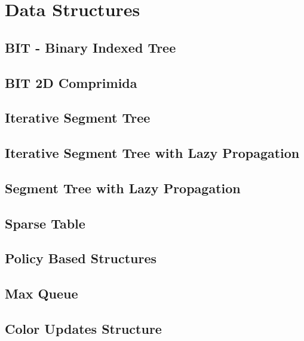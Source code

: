 \section{Data Structures}
\subsection{	BIT - Binary Indexed Tree}
\raggedbottom
\hrulefill
\subsection{BIT 2D Comprimida}
\raggedbottom
\hrulefill
\subsection{	Iterative Segment Tree}
\raggedbottom
\hrulefill
\subsection{Iterative Segment Tree with Lazy Propagation}
\raggedbottom
\hrulefill
\subsection{Segment Tree with Lazy Propagation}
\raggedbottom
\hrulefill
\subsection{	Sparse Table}
\raggedbottom
\hrulefill
\subsection{	Policy Based Structures}
\raggedbottom
\hrulefill
\subsection{Max Queue}
\raggedbottom
\hrulefill
\subsection{	Color Updates Structure}
\raggedbottom
\hrulefill
